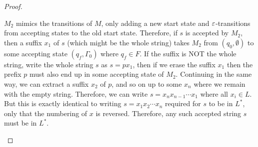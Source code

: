 \begin{problem}
\begin{enumalph}
\begin{Answer}
\begin{claim}
\begin{proof}
\begin{enumroman}
                    $M_2$ mimics the transitions of $M$, only adding a new start state
                    and $\varepsilon$-transitions from accepting states to the old start state.
                    Therefore, if $s$ is accepted by $M_2$, then a suffix $x_1$ of $s$
                    (which might be the whole string) takes $M_2$ from $(q_0, \emptyset)$
                    to some accepting state $(q_f, \Gamma_0)$ where $q_f \in F$.
                    If the suffix is NOT the whole string, write the whole string $s$ as
                    $s = px_1$, then if we erase the suffix $x_1$ then the prefix $p$
                    must also end up in some accepting state of $M_2$.
                    Continuing in the same way, we can extract a suffix $x_2$ of $p$,
                    and so on up to some $x_n$ where we remain with the empty string.
                    Therefore, we can write $s = x_nx_{n-1} \cdots x_1$ where all $x_i \in L$.
                    But this is exactly identical to writing $s = x_1x_2 \cdots x_n$
                    required for $s$ to be in $L^*$,
                    only that the numbering of $x$ is reversed.
                    Therefore, any such accepted string $s$ must be in $L^*$.
                \end{enumroman}
            \end{proof}
          \end{claim}
      \end{Answer}
  \end{enumalph}
\end{problem}
